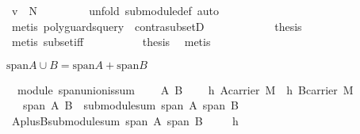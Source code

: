 \begin{isabellebody}
\ {\isachardoublequoteopen}v\ {\isasymin}\ N{\isachardoublequoteclose}\ \isanewline
\ \ \ \ \ \ \isamarkupfalse%
\ {\isacharparenleft}unfold\ submodule{\isacharunderscore}def{\isacharcomma}\ auto{\isacharparenright}\isanewline
\ \ \ \ \ \ \isamarkupfalse%
\ {\isacharparenleft}metis\ {\isacharparenleft}poly{\isacharunderscore}guards{\isacharunderscore}query{\isacharparenright}\ \ contra{\isacharunderscore}subsetD{\isacharparenright}\isanewline
\ \isanewline
\ \ \ \ \isacommand{{\isacharbraceright}}\isamarkupfalse%
\isanewline
\ \ \ \ \isamarkupfalse%
\ {\isacharquery}thesis\isanewline
\ \ \ \ \ \ \isamarkupfalse%
\ {\isacharparenleft}metis\ subset{\isacharunderscore}iff{\isacharparenright}\isanewline
\ \ \isamarkupfalse%
\isanewline
\ \ \isamarkupfalse%
\ {}\ {}\ \isamarkupfalse%
\ {\isacharquery}thesis\ \isamarkupfalse%
\ metis\isanewline
{}\isamarkupfalse%
%
\endisatagproof
{\isafoldproof}%
%
\isadelimproof
%
\endisadelimproof
%
\begin{isamarkuptext}%
$\text{span} A\cup B = \text{span} A + \text{span} B$%
\end{isamarkuptext}%
\isamarkuptrue%
\isamarkupfalse%
\ {\isacharparenleft}\ module{\isacharparenright}\ span{\isacharunderscore}union{\isacharunderscore}is{\isacharunderscore}sum{\isacharcolon}\ \isanewline
\ \ \ A\ B\isanewline
\ \ \ \ h{}{\isacharcolon}\ {\isachardoublequoteopen}A{\isasymsubseteq}carrier\ M{\isachardoublequoteclose}\ \ h{}{\isacharcolon}\ {\isachardoublequoteopen}B{\isasymsubseteq}carrier\ M{\isachardoublequoteclose}\isanewline
\ \ \ {\isachardoublequoteopen}span\ {\isacharparenleft}A{\isasymunion}\ B{\isacharparenright}\ {\isacharequal}\ submodule{\isacharunderscore}sum\ {\isacharparenleft}span\ A{\isacharparenright}\ {\isacharparenleft}span\ B{\isacharparenright}{\isachardoublequoteclose}\isanewline
%
\isadelimproof
%
\endisadelimproof
%
\isatagproof
{}\isamarkupfalse%
{\isacharminus}\isanewline
\ \ \isamarkupfalse%
\ {\isacharquery}AplusB{\isacharequal}{\isachardoublequoteopen}submodule{\isacharunderscore}sum\ {\isacharparenleft}span\ A{\isacharparenright}\ {\isacharparenleft}span\ B{\isacharparenright}{\isachardoublequoteclose}\isanewline
\ \ \isamarkupfalse%
\ \ h{}\ \isamarkupfalse%

\end{isabellebody}
